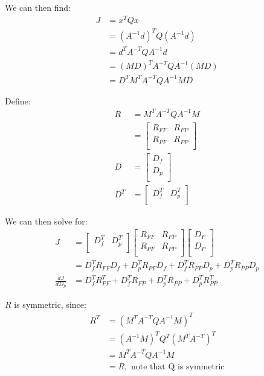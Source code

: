 \documentclass[11pt]{article}
\begin{document}

We can then find:
\begin{align*}
J &= x^T Q x \\
&= (A^{-1} d)^T Q (A^{-1} d) \\
&= d^T A^{-T} Q A^{-1} d \\
&= (MD)^T A^{-T} Q A^{-1} (MD) \\
&= D^T M^T A^{-T} Q A^{-1}  M D
\end{align*}

Define:
\begin{align*}
R &= M^T A^{-T} Q A^{-1}  M \\
&= 
\begin{bmatrix}
R_{FF} & R_{FP} \\
R_{PF} & R_{PP} \\
\end{bmatrix} \\
D &= 
\begin{bmatrix}
D_f \\
D_p \\
\end{bmatrix} \\
D^T &= 
\begin{bmatrix} 
D_f^T & D_p^T \\
\end{bmatrix}
\end{align*}

We can then solve for:
\begin{align*}
J &= 
\begin{bmatrix} 
D_f^T & D_p^T \\
\end{bmatrix}
\begin{bmatrix}
R_{FF} & R_{FP} \\
R_{PF} & R_{PP} \\
\end{bmatrix} 
\begin{bmatrix}
D_F \\
D_P \\
\end{bmatrix} \\
&= D_f^T R_{FF} D_f + D_p^T R_{PF} D_f + D_f^T R_{FP} D_p + D_p^T R_{PP} D_p \\
\frac{dJ}{d D_p} &= D_f^T R_{PF}^T + D_f^T R_{FP} + D_p^T R_{PP} + D_p^T R_{PP}^T 
\end{align*} 

$R$ is symmetric, since:
\begin{align*}
R^T &= (M^T A^{-T} Q A^{-1}  M)^T \\
&= (A^{-1}  M)^T Q^T (M^T A^{-T})^T \\
&= M^T A^{-T} Q A^{-1}  M \\
&= R, \text{ note that Q is symmetric}
\end{align*}
\end{document}
